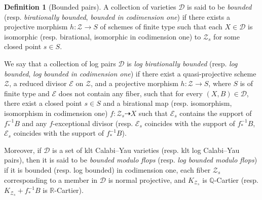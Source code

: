 \documentclass[11pt]{amsart}
\numberwithin{equation}{section}
\newcommand\han[1]{\todo[color=yellow!40]{#1}} %
\newcommand{\bQ}{\mathbb{Q}}
\newcommand{\Rr}{\mathbb{R}}
\theoremstyle{definition}
\theoremstyle{definition}
\newtheorem{defn}[thm]{Definition}
\begin{document}
\begin{defn}[Bounded pairs]\label{sec.bdd}
A collection of varieties $ \mathcal{D}$ is
said to be \emph{bounded} (resp. 
\emph{birationally bounded}, \emph{bounded in codimension one}) if there exists a projective morphism $h\colon \mathcal{Z}\rightarrow S$
of schemes of finite type such that
each $X\in \mathcal{D}$ is isomorphic (resp. birational, isomorphic in codimension one) to $\mathcal{Z}_s$ 
for some closed point $s\in S$.

We say that a collection of log pairs $\mathcal{D}$ is 
{\it log birationally bounded} (resp.  \emph{log bounded},  \emph{log bounded in codimension one})
if there exist a  quasi-projective scheme $\mathcal{Z}$, a 
reduced divisor $\mathcal{E}$ on $\mathcal Z$, and a 
projective morphism $h\colon \mathcal{Z}\to S$, where 
$S$ is of finite type and $\mathcal{E}$ does not contain 
any fiber, such that for every $(X,B)\in \mathcal{D}$, 
there exist a closed point $s \in S$ and a birational
map (resp. isomorphism, isomorphism in codimension one) $f \colon \mathcal{Z}_s \dashrightarrow X$ 
such that $\mathcal{E}_s$ contains the support of $f_*^{-1}B$ 
and any $f$-exceptional divisor (resp. $\mathcal{E}_s$ 
coincides with the support of $f_*^{-1}B$, $\mathcal{E}_s$ 
coincides with the support of $f_*^{-1}B$).

Moreover, if $\mathcal{D}$ is a set of klt Calabi--Yau 
varieties (resp. klt log Calabi--Yau pairs), then it is 
said to be {\it bounded modulo flops} (resp. {\it log 
	bounded modulo flops}) if it is bounded (resp. log bounded) in 
codimension one, each fiber $\mathcal{Z}_{s}$ 
corresponding to a member in $\mathcal{D}$ is normal projective, 
and $K_{\mathcal{Z}_s}$ is $\bQ$-Cartier (resp. $K_{\mathcal{Z}_s}+f_*^{-1}B$ is $\Rr$-Cartier). 
\end{defn}

\end{document}
